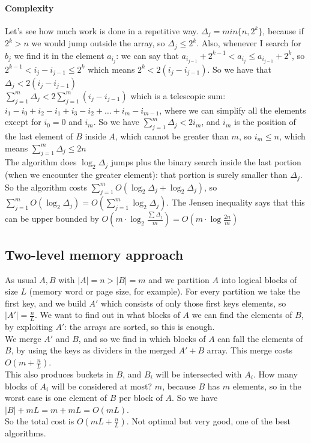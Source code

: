 \documentclass[10pt]{report}
\begin{document}
\paragraph{Complexity} Let's see how much work is done in a repetitive way. $\Delta_j = min\{n, 2^k\}$, because if $2^k > n$ we would jump outside the array, so $\Delta_j \leq 2^k$. Also, whenever I search for $b_j$ we find it in the element $a_{i_j}$: we can say that $a_{i_{j-1}} + 2^{k-1} < a_{i_j} \leq a_{i_{j-1}} + 2^k$, so $2^{k-1} < i_j - i_{j-1} \leq 2^k$ which means $2^k < 2(i_j - i_{j-1})$. So we have that $\Delta_j < 2(i_j - i_{j-1})$\\
$\sum_{j=1}^m \Delta_j < 2\sum_{j=1}^m (i_j - i_{j-1})$ which is a telescopic sum: $i_1 - i_0 + i_2 - i_1 + i_3 - i_2 + \ldots + i_m - i_{m-1}$, where we can simplify all the elements except for $i_0 = 0$ and $i_m$. So we have $\sum_{j=1}^m \Delta_j < 2 i_m$, and $i_m$ is the position of the last element of $B$ inside $A$, which cannot be greater than $m$, so $i_m \leq n$, which means $\sum_{j=1}^m \Delta_j \leq 2n$\\
The algorithm does $\log_2 \Delta_j$ jumps plus the binary search inside the last portion (when we encounter the greater element): that portion is surely smaller than $\Delta_j$. So the algorithm costs $\sum_{j=1}^m O(\log_2\Delta_j + \log_2 \Delta_j)$, so $\sum_{j=1}^m O(\log_2\Delta_j) = O\left(\sum_{j=1}^m\log_2\Delta_j\right)$. The Jensen inequality says that this can be upper bounded by $O\left(m\cdot\log_2\frac{\sum\Delta_j}{m}\right) = O(m\cdot\log\frac{2n}{m})$
\subsection{Two-level memory approach} As usual $A, B$ with $|A| = n > |B| = m$ and we partition $A$ into logical blocks of size $L$ (memory word or page size, for example). For every partition we take the first key, and we build $A'$ which consists of only those first keys elements, so $|A'| = \frac{n}{L}$. We want to find out in what blocks of $A$ we can find the elements of $B$, by exploiting $A'$: the arrays are sorted, so this is enough.\\
We merge $A'$ and $B$, and so we find in which blocks of $A$ can fall the elements of $B$, by using the keys as dividers in the merged $A'+B$ array. This merge costs $O\left(m + \frac{n}{L}\right)$.\\
This also produces buckets in $B$, and $B_i$ will be intersected with $A_i$. How many blocks of $A_i$ will be considered at most? $m$, because $B$ has $m$ elements, so in the worst case is one element of $B$ per block of $A$. So we have $|B| + mL = m + mL = O(mL)$.\\
So the total cost is $O(mL + \frac{n}{L})$. Not optimal but very good, one of the best algorithms.
\end{document}
